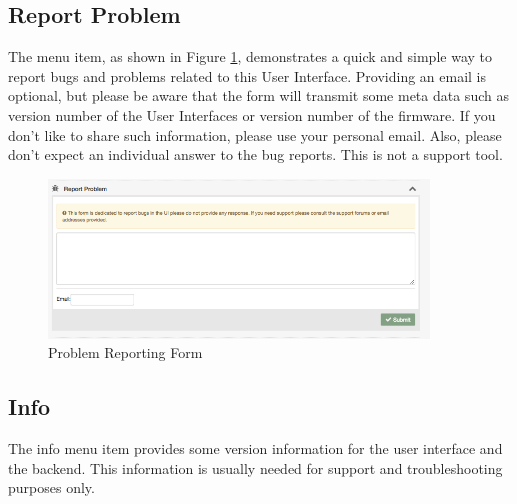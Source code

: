 \subsection{Report Problem}

The menu item, as shown in Figure \ref{shui79}, demonstrates a quick and simple way to 
report bugs and problems related to this User Interface. Providing an email is optional, 
but please be aware that the form will transmit some meta data such as version number of 
the User Interfaces or version number of the firmware. If you don’t like to share such 
information, please use your personal email. Also, please don’t expect an individual 
answer to the bug reports. This is not a support tool.


\begin{figure}
\begin{center}
\includegraphics[width=0.9\textwidth]{pngs/cap4/shui79.png}
\caption{Problem Reporting Form}
\label{shui79}
\end{center}
\end{figure}

\subsection{Info}

The info menu item provides some version information for the user interface and the 
backend. This information is usually needed for support and troubleshooting purposes only.
